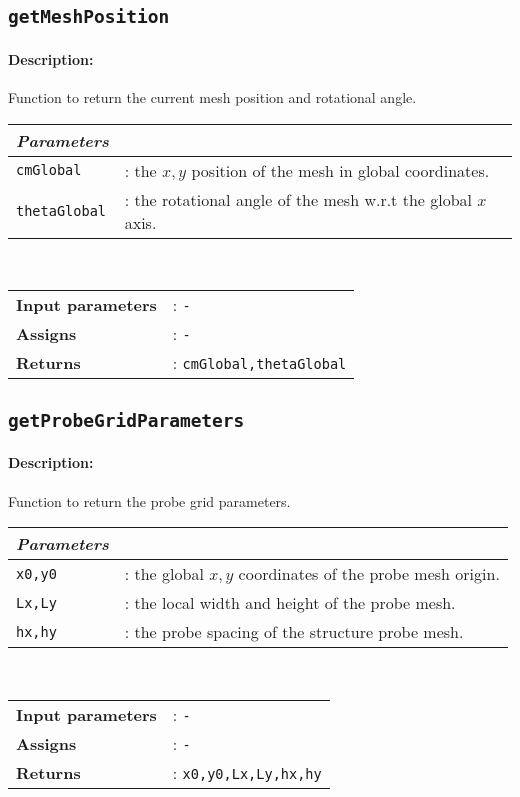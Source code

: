 \subsection{\texttt{getMeshPosition}}

	\paragraph{Description:} Function to return the current mesh position and rotational angle.\\
	
		\begin{tabular}{lp{10cm}}
			\textit{Parameters} & \\ \hline
			\texttt{cmGlobal} &: the $x,y$ position of the mesh in global coordinates.\\ 
			\texttt{thetaGlobal} &: the rotational angle of the mesh w.r.t the global $x$ axis.\\
		\end{tabular} \vspace{5 mm}
	\\
	\begin{tabular}{lp{10cm}}
		\textbf{Input parameters} &: \texttt{-}\\ 
		\textbf{Assigns} &: \texttt{-}\\ 			
		\textbf{Returns} &: \texttt{cmGlobal,thetaGlobal}\\ 					
	\end{tabular}

\subsection{\texttt{getProbeGridParameters}}

	\paragraph{Description:} Function to return the probe grid parameters.\\
	
		\begin{tabular}{lp{10cm}}
			\textit{Parameters} & \\ \hline
			\texttt{x0,y0} &: the global $x,y$ coordinates of the probe mesh origin.\\ 
			\texttt{Lx,Ly} &: the local width and height of the probe mesh.\\
			\texttt{hx,hy} &: the probe spacing of the structure probe mesh.\\			
		\end{tabular} \vspace{5 mm}
	\\
	\begin{tabular}{lp{10cm}}
		\textbf{Input parameters} &: \texttt{-}\\ 
		\textbf{Assigns} &: \texttt{-}\\ 			
		\textbf{Returns} &: \texttt{x0,y0,Lx,Ly,hx,hy}\\ 					
	\end{tabular}

